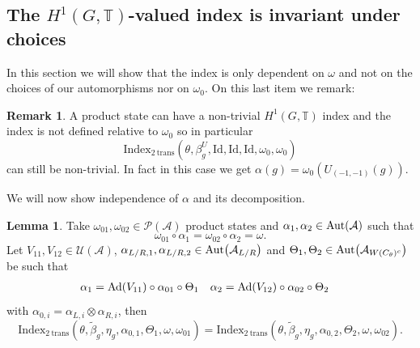 \documentclass[12pt,a4paper,twoside]{article}
\let\originalleft\left
\let\originalright\right
\renewcommand{\left}{\mathopen{}\mathclose\bgroup\originalleft}
\renewcommand{\right}{\aftergroup\egroup\originalright}
\newcommand{\UU}{\mathcal U}
\newcommand{\PP}{\mathcal P}
\newcommand{\TT}{\mathbb T}
\renewcommand{\AA}{\mathcal A}
\newcommand{\Ad}[1]{\textrm{Ad}\left(#1\right)}
\newcommand{\Aut}[1]{\textrm{Aut}\left(#1\right)}
\theoremstyle{definition}
\newtheorem{lemma}[theorem]{Lemma}
\newtheorem{remark}[theorem]{Remark}
\numberwithin{equation}{section}
\begin{document}
\subsection{The $H^1(G,\TT)$-valued index is invariant under choices}
In this section we will show that the index is only dependent on $\omega$ and not on the choices of our automorphisms nor on $\omega_0$. On this last item we remark:
\begin{remark}\label{rem:NontrivialProductState}
	A product state can have a non-trivial $H^1(G,\TT)$ index and the index is not defined relative to $\omega_0$ so in particular
	\begin{equation}
		\textrm{Index}_{2\:\text{trans}}(\theta,\beta_g^U,\textrm{Id},\textrm{Id},\textrm{Id},\omega_0,\omega_0)
	\end{equation}
	can still be non-trivial. In fact in this case we get $\alpha(g)=\omega_0(U_{(-1,-1)}(g))$.
\end{remark}
We will now show independence of $\alpha$ and its decomposition.
\begin{lemma}
	Take $\omega_{01},\omega_{02}\in\PP(\AA)$ product states and $\alpha_1,\alpha_2\in\Aut{\AA}$ such that
	\begin{equation}
		\omega_{01}\circ\alpha_1=\omega_{02}\circ\alpha_2=\omega.
	\end{equation}
	Let $V_{11},V_{12}\in\UU(\AA)$, $\alpha_{L/R,1},\alpha_{L/R,2}\in\Aut{\AA_{L/R}}$ and $\Theta_1,\Theta_2\in \Aut{\AA_{W(C_\theta)^c}}$ be such that
	\begin{align}
		\alpha_1&=\Ad{V_{11}}\circ\alpha_{01}\circ\Theta_1&\alpha_2&=\Ad{V_{12}}\circ\alpha_{02}\circ \Theta_2
	\end{align}
	with $\alpha_{0,i}=\alpha_{L,i}\otimes\alpha_{R,i}$, then
	\begin{equation}
		\textrm{Index}_{2\:\text{trans}}(\theta,\tilde{\beta}_g,\eta_g,\alpha_{0,1},\Theta_1,\omega,\omega_{01})=\textrm{Index}_{2\:\text{trans}}(\theta,\tilde{\beta}_g,\eta_g,\alpha_{0,2},\Theta_2,\omega,\omega_{02}).
	\end{equation}
\end{lemma}
\end{document}
